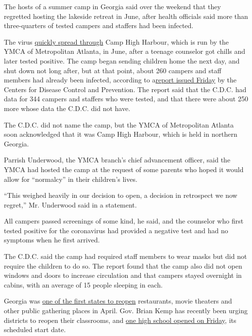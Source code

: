 The hosts of a summer camp in Georgia said over the weekend that they
regretted hosting the lakeside retreat in June, after health officials
said more than three-quarters of tested campers and staffers had been
infected.

The virus
\href{https://www.nytimes.com/2020/07/31/health/coronavirus-children-camp.html}{quickly
spread through} Camp High Harbour, which is run by the YMCA of
Metropolitan Atlanta, in June, after a teenage counselor got chills and
later tested positive. The camp began sending children home the next
day, and shut down not long after, but at that point, about 260 campers
and staff members had already been infected, according to
a\href{https://www.cdc.gov/mmwr/volumes/69/wr/mm6931e1.htm?s_cid=mm6931e1_w}{report
issued Friday} by the Centers for Disease Control and Prevention. The
report said that the C.D.C. had data for 344 campers and staffers who
were tested, and that there were about 250 more whose data the C.D.C.
did not have.

The C.D.C. did not name the camp, but the YMCA of Metropolitan Atlanta
soon acknowledged that it was Camp High Harbour, which is held in
northern Georgia.

Parrish Underwood, the YMCA branch's chief advancement officer, said the
YMCA had hosted the camp at the request of some parents who hoped it
would allow for ``normalcy'' in their children's lives.

``This weighed heavily in our decision to open, a decision in retrospect
we now regret,'' Mr. Underwood said in a statement.

All campers passed screenings of some kind, he said, and the counselor
who first tested positive for the coronavirus had provided a negative
test and had no symptoms when he first arrived.

The C.D.C. said the camp had required staff members to wear masks but
did not require the children to do so. The report found that the camp
also did not open windows and doors to increase circulation and that
campers stayed overnight in cabins, with an average of 15 people
sleeping in each.

Georgia was
\href{https://www.nytimes.com/2020/04/20/us/coronavirus-us-hot-spots-reopening.html}{one
of the first states to reopen} restaurants, movie theaters and other
public gathering places in April. Gov. Brian Kemp has recently been
urging districts to reopen their classrooms, and
\href{https://www.nytimes.com/2020/07/27/us/covid-georgia-schools-masks.html}{one
high school opened on Friday}, its scheduled start date.

